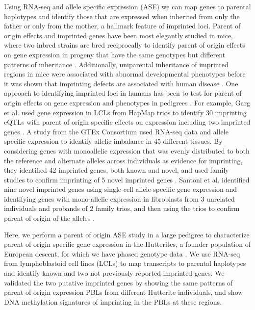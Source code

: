 Using RNA-seq and allele specific expression (ASE) we can map genes to parental haplotypes and identify those that are expressed when inherited from only the father or only from the mother, a hallmark feature of imprinted loci. Parent of origin effects and imprinted genes have been most elegantly studied in mice, where two inbred strains are bred reciprocally to identify parent of origin effects on gene expression in progeny that have the same genotypes but different patterns of inheritance \cite{Babak2015}. Additionally, uniparental inheritance of imprinted regions in mice were associated with abnormal developmental phenotypes\cite{Cattanach:1985hu} before it was shown that imprinting defects are associated with human disease \cite{Nicholls:vh}. One approach to identifying imprinted loci in humans has been to test for parent of origin effects on gene expression and phenotypes in pedigrees \cite{Kong:2009kk,Benonisdottir:2016dz}. For example, Garg et al. used gene expression in LCLs from HapMap trios to identify 30 imprinting eQTLs with parent of origin specific effects on expression including two imprinted genes \cite{Garg2012a}. A study from the GTEx Consortium used RNA-seq data and allele specific expression to identify allelic imbalance in 45 different tissues. By considering genes with monoallelic expression that was evenly distributed to both the reference and alternate alleles across individuals as evidence for imprinting, they identified 42 imprinted genes, both known and novel, and used family studies to confirm imprinting of 5 novel imprinted genes \cite{Baran:2015cx}. Santoni et al. identified nine novel imprinted genes using single-cell allele-specific gene expression and identifying genes with mono-allelic expression in fibroblasts from 3 unrelated individuals and probands of 2 family trios, and then using the trios to confirm parent of origin of the alleles \cite{Santoni:2017hu}.

Here, we perform a parent of origin ASE study in a large pedigree to characterize parent of origin specific gene expression in the Hutterites, a founder population of European descent, for which we have phased genotype data \cite{Livne2015}. We use RNA-seq from lymphoblastoid cell lines (LCLs) to map transcripts to parental haplotypes and identify known and two not previously reported imprinted genes. We validated the two putative imprinted genes by showing the same patterns of parent of origin expression PBLs from different Hutterite individuals, and show DNA methylation signatures of imprinting in the PBLs at these regions.
	
